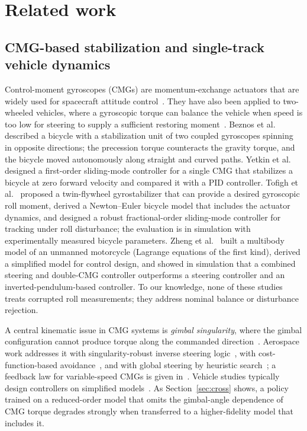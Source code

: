 \documentclass[preprint,12pt,authoryear=false]{elsarticle}
\theoremstyle{remark}\newtheorem{remark}{Remark}
\theoremstyle{plain}\newtheorem{proposition}{Proposition}\newtheorem{lemma}{Lemma}
\theoremstyle{definition}\newtheorem{assumption}{Assumption}
\begin{document}
\section{Related work}
\label{sec:related_work}

\subsection{CMG-based stabilization and single-track vehicle dynamics}
Control-moment gyroscopes (CMGs) are momentum-exchange actuators that are widely used for spacecraft attitude control~\cite{wie2001singularity,schaub1998cmg}. They have also been applied to two-wheeled vehicles, where a gyroscopic torque can balance the vehicle when speed is too low for steering to supply a sufficient restoring moment~\cite{beznos1998control,yetkin2014gyro,tofigh2021fractional,zheng2022dynamic}. Beznos et al.~\cite{beznos1998control} described a bicycle with a stabilization unit of two coupled gyroscopes spinning in opposite directions; the precession torque counteracts the gravity torque, and the bicycle moved autonomously along straight and curved paths. Yetkin et al.~\cite{yetkin2014gyro} designed a first-order sliding-mode controller for a single CMG that stabilizes a bicycle at zero forward velocity and compared it with a PID controller. Tofigh et al.~\cite{tofigh2021fractional} proposed a twin-flywheel gyrostabilizer that can provide a desired gyroscopic roll moment, derived a Newton--Euler bicycle model that includes the actuator dynamics, and designed a robust fractional-order sliding-mode controller for tracking under roll disturbance; the evaluation is in simulation with experimentally measured bicycle parameters. Zheng et al.~\cite{zheng2022dynamic} built a multibody model of an unmanned motorcycle (Lagrange equations of the first kind), derived a simplified model for control design, and showed in simulation that a combined steering and double-CMG controller outperforms a steering controller and an inverted-pendulum-based controller. To our knowledge, none of these studies treats corrupted roll measurements; they address nominal balance or disturbance rejection.

A central kinematic issue in CMG systems is \emph{gimbal singularity}, where the gimbal configuration cannot produce torque along the commanded direction~\cite{wie2001singularity,takada2010control}. Aerospace work addresses it with singularity-robust inverse steering logic~\cite{wie2001singularity}, with cost-function-based avoidance~\cite{takada2010control}, and with global steering by heuristic search~\cite{papakonstantinou2021global}; a feedback law for variable-speed CMGs is given in~\cite{schaub1998cmg}. Vehicle studies typically design controllers on simplified models~\cite{zheng2022dynamic}. As Section~\ref{sec:cross} shows, a policy trained on a reduced-order model that omits the gimbal-angle dependence of CMG torque degrades strongly when transferred to a higher-fidelity model that includes it.
\end{document}
